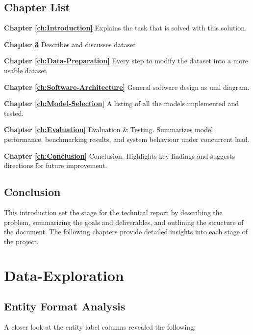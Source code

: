 \section{Chapter List}

\textbf{Chapter \ref{ch:Introduction}} Explains the task that is solved with this solution.

\textbf{Chapter \ref{ch:Data-Exploration}} Describes and discusses dataset

\textbf{Chapter \ref{ch:Data-Preparation}} Every step to modify the dataset into a more usable dataset

\textbf{Chapter \ref{ch:Software-Architecture}} General software design as uml diagram.

\textbf{Chapter \ref{ch:Model-Selection}} A listing of all the models implemented and tested.


\textbf{Chapter \ref{ch:Evaluation}} Evaluation \& Testing. Summarizes model performance, benchmarking results, and system behaviour under concurrent load.




\textbf{Chapter \ref{ch:Conclusion}} Conclusion. Highlights key findings and suggests directions for future improvement.


\section{Conclusion}

This introduction set the stage for the technical report by describing the problem, summarizing the goals and deliverables, and outlining the structure of the document. The following chapters provide detailed insights into each stage of the project.


\chapter{Data-Exploration}
\label{ch:Data-Exploration}

\section{Entity Format Analysis}

A closer look at the entity label columns revealed the following:

